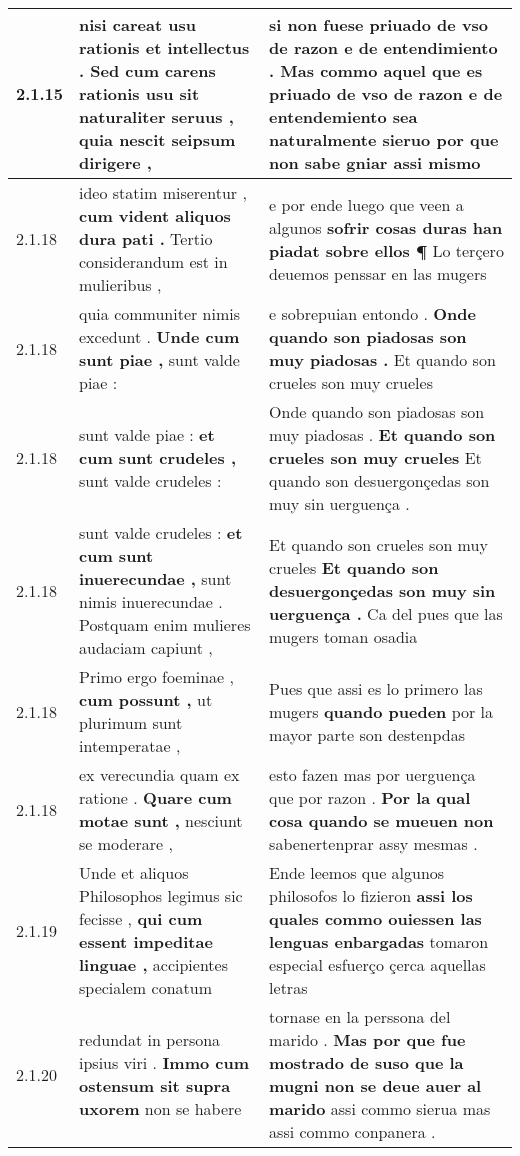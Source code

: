 \begin{tabular}{|p{1cm}|p{6.5cm}|p{6.5cm}|}
2.1.15 & nisi careat usu rationis et intellectus . \textbf{ Sed cum carens rationis usu sit naturaliter seruus , } quia nescit seipsum dirigere , & si non fuese priuado de vso de razon e de entendimiento . \textbf{ Mas commo aquel que es priuado de vso de razon e de entendemiento sea naturalmente sieruo } por que non sabe gniar assi mismo \\\hline
2.1.18 & ideo statim miserentur , \textbf{ cum vident aliquos dura pati . } Tertio considerandum est in mulieribus , & e por ende luego que veen a algunos \textbf{ sofrir cosas duras han piadat sobre ellos ¶ } Lo terçero deuemos penssar en las mugers \\\hline
2.1.18 & quia communiter nimis excedunt . \textbf{ Unde cum sunt piae , } sunt valde piae : & e sobrepuian entondo . \textbf{ Onde quando son piadosas son muy piadosas . } Et quando son crueles son muy crueles \\\hline
2.1.18 & sunt valde piae : \textbf{ et cum sunt crudeles , } sunt valde crudeles : & Onde quando son piadosas son muy piadosas . \textbf{ Et quando son crueles son muy crueles } Et quando son desuergonçedas son muy sin uerguença . \\\hline
2.1.18 & sunt valde crudeles : \textbf{ et cum sunt inuerecundae , } sunt nimis inuerecundae . Postquam enim mulieres audaciam capiunt , & Et quando son crueles son muy crueles \textbf{ Et quando son desuergonçedas son muy sin uerguença . } Ca del pues que las mugers toman osadia \\\hline
2.1.18 & Primo ergo foeminae , \textbf{ cum possunt , } ut plurimum sunt intemperatae , & Pues que assi es lo primero las mugers \textbf{ quando pueden } por la mayor parte son destenpdas \\\hline
2.1.18 & ex verecundia quam ex ratione . \textbf{ Quare cum motae sunt , } nesciunt se moderare , & esto fazen mas por uerguença que por razon . \textbf{ Por la qual cosa quando se mueuen non } sabenertenprar assy mesmas . \\\hline
2.1.19 & Unde et aliquos Philosophos legimus sic fecisse , \textbf{ qui cum essent impeditae linguae , } accipientes specialem conatum & Ende leemos que algunos philosofos lo fizieron \textbf{ assi los quales commo ouiessen las lenguas enbargadas } tomaron especial esfuerço çerca aquellas letras \\\hline
2.1.20 & redundat in persona ipsius viri . \textbf{ Immo cum ostensum sit supra uxorem } non se habere & tornase en la perssona del marido . \textbf{ Mas por que fue mostrado de suso que la mugni non se deue auer al marido } assi commo sierua mas assi commo conpanera . \\\hline

\end{tabular}
